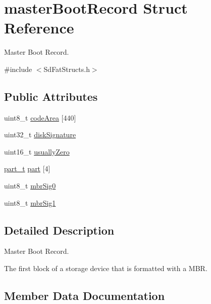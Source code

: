 \hypertarget{structmaster_boot_record}{}\section{master\+Boot\+Record Struct Reference}
\label{structmaster_boot_record}


Master Boot Record.  




{\ttfamily \#include $<$Sd\+Fat\+Structs.\+h$>$}

\subsection*{Public Attributes}
\begin{DoxyCompactItemize}
\item 
uint8\+\_\+t \hyperlink{structmaster_boot_record_a26ca1fb4ebbff2cc1a54153b1dfcd688}{code\+Area} \mbox{[}440\mbox{]}
\item 
uint32\+\_\+t \hyperlink{structmaster_boot_record_a77151c641444c0653ff71a253f0423ef}{disk\+Signature}
\item 
uint16\+\_\+t \hyperlink{structmaster_boot_record_afacfc863e98f64053cd9459c6dec948f}{usually\+Zero}
\item 
\hyperlink{_sd_fat_structs_8h_a37251e7d5c69a159be727a3fc8c9d0e6}{part\+\_\+t} \hyperlink{structmaster_boot_record_aa4e294e50f311635c10c92f4c99227c5}{part} \mbox{[}4\mbox{]}
\item 
uint8\+\_\+t \hyperlink{structmaster_boot_record_a42b0b413ecb21ac5314d4f6bca05308f}{mbr\+Sig0}
\item 
uint8\+\_\+t \hyperlink{structmaster_boot_record_aafbbcb4f6a2d1181c6458d4c9603df4f}{mbr\+Sig1}
\end{DoxyCompactItemize}


\subsection{Detailed Description}
Master Boot Record. 

The first block of a storage device that is formatted with a M\+BR. 

\subsection{Member Data Documentation}
